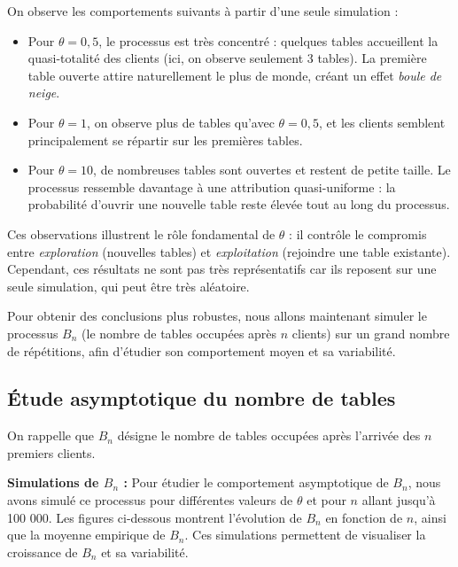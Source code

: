 \documentclass[12pt, a4paper]{article}
\theoremstyle{definition}
\theoremstyle{plain}
\begin{document}
On observe les comportements suivants à partir d'une seule simulation :

\begin{itemize}
  \item Pour $\theta = 0{,}5$, le processus est très concentré : quelques tables accueillent
        la quasi-totalité des clients (ici, on observe seulement 3 tables). La première table ouverte attire naturellement le plus de monde, créant un effet \emph{boule de neige}.

  \item Pour $\theta = 1$, on observe plus de tables qu'avec $\theta = 0{,}5$, et les clients semblent principalement se répartir sur les premières tables.

  \item Pour $\theta = 10$, de nombreuses tables sont ouvertes et restent de petite taille.
        Le processus ressemble davantage à une attribution quasi-uniforme : la probabilité
        d'ouvrir une nouvelle table reste élevée tout au long du processus.
\end{itemize}

\medskip
Ces observations illustrent le rôle fondamental de $\theta$ : il contrôle le compromis
entre \emph{exploration} (nouvelles tables) et \emph{exploitation} (rejoindre une table
existante). Cependant, ces résultats ne sont pas très représentatifs car ils reposent sur une seule simulation, qui peut être très aléatoire.

\medskip
Pour obtenir des conclusions plus robustes, nous allons maintenant simuler le processus \( B_n \) (le nombre de tables occupées après \( n \) clients) sur un grand nombre de répétitions, afin d'étudier son comportement moyen et sa variabilité.

\subsection{Étude asymptotique du nombre de tables}

On rappelle que \( B_n \) désigne le nombre de tables occupées après l'arrivée des \( n \) premiers clients.

\medskip
\noindent
\textbf{Simulations de \( B_n \) :}
Pour étudier le comportement asymptotique de \( B_n \), nous avons simulé ce processus pour différentes valeurs de \(\theta\) et pour \( n \) allant jusqu'à 100 000. Les figures ci-dessous montrent l'évolution de \( B_n \) en fonction de \( n \), ainsi que la moyenne empirique de \( B_n \). Ces simulations permettent de visualiser la croissance de \( B_n \) et sa variabilité.
\end{document}
